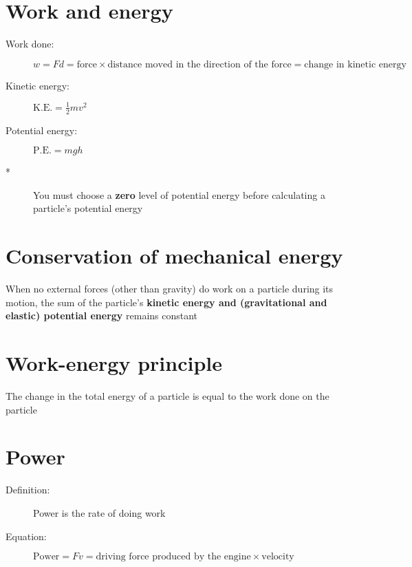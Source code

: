 \section{Work and energy}
\begin{description}
    \item[Work done:] $w=Fd=\text{force}\times\text{distance moved in the direction of the force}=\text{change in kinetic energy}$
    \item[Kinetic energy:] $\text{K.E.}=\frac{1}{2}mv^2$
    \item[Potential energy:] $\text{P.E.}=mgh$
    \item[*] You must choose a \textbf{zero} level of potential energy before calculating a particle's potential energy
\end{description}



\section{Conservation of mechanical energy}
When no external forces (other than gravity) do work on a particle during its motion, the sum of the particle's \textbf{kinetic energy and (gravitational and elastic) potential energy} remains constant

\section{Work-energy principle}
The change in the total energy of a particle is equal to the work done on the particle

\section{Power}
\begin{description}
    \item[Definition:] Power is the rate of doing work
    \item[Equation:] $\text{Power}=Fv=\text{driving force produced by the engine}\times\text{velocity}$
\end{description}